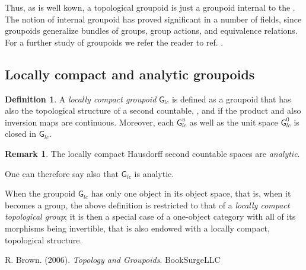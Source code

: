 \documentclass[12pt]{article}
\theoremstyle{plain}
\theoremstyle{definition}
\newtheorem{definition}{Definition}[section]
\newtheorem{remark}{Remark}[section]
\numberwithin{equation}{section}
\newcommand{\grp}{{\mathsf{G}}}
\newcommand{\<}{{\langle}}
\begin{document}
Thus, as is well kown, a topological groupoid is just a groupoid internal to the 
. The notion of internal groupoid has proved significant in a number of fields, since groupoids generalize bundles of groups, group actions, and equivalence relations. For a further study of groupoids we refer the reader to ref. \cite{Brown2006}.


\subsection{Locally compact and analytic groupoids}

\begin{definition}
A \emph{locally compact groupoid} $\grp_{lc}$ is defined as a groupoid that has also the topological structure of a second countable, , and if the product and also inversion maps are continuous. Moreover, each $\grp_{lc}^u$ as well as the unit space $\grp_{lc}^0$ is closed in $\grp_{lc}$. 
\end{definition}

\begin{remark}
 The locally compact Hausdorff second countable spaces are {\em analytic}.

 One can therefore say also that $\grp_{lc}$ is analytic.

 When the groupoid $\grp_{lc}$ has only one object in its object space, that is, when it becomes a group, the above
definition is restricted to that of a \emph{locally compact topological group}; it is then a special case of a one-object category with all of its morphisms being invertible, that is also endowed with a locally compact, topological structure.

\end{remark}
 
\begin{thebibliography}{9}

R. Brown. (2006). \emph{Topology and Groupoids}. BookSurgeLLC
\end{thebibliography}

\end{document}
